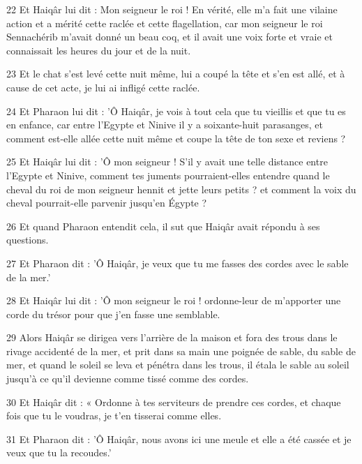 \par 22 Et Haiqâr lui dit : Mon seigneur le roi ! En vérité, elle m'a fait une vilaine action et a mérité cette raclée et cette flagellation, car mon seigneur le roi Sennachérib m'avait donné un beau coq, et il avait une voix forte et vraie et connaissait les heures du jour et de la nuit.

\par 23 Et le chat s'est levé cette nuit même, lui a coupé la tête et s'en est allé, et à cause de cet acte, je lui ai infligé cette raclée.

\par 24 Et Pharaon lui dit : 'Ô Haiqâr, je vois à tout cela que tu vieillis et que tu es en enfance, car entre l'Egypte et Ninive il y a soixante-huit parasanges, et comment est-elle allée cette nuit même et coupe la tête de ton sexe et reviens ?

\par 25 Et Haiqâr lui dit : 'Ô mon seigneur ! S'il y avait une telle distance entre l'Egypte et Ninive, comment tes juments pourraient-elles entendre quand le cheval du roi de mon seigneur hennit et jette leurs petits ? et comment la voix du cheval pourrait-elle parvenir jusqu'en Égypte ?

\par 26 Et quand Pharaon entendit cela, il sut que Haiqâr avait répondu à ses questions.

\par 27 Et Pharaon dit : 'Ô Haiqâr, je veux que tu me fasses des cordes avec le sable de la mer.'

\par 28 Et Haiqâr lui dit : 'Ô mon seigneur le roi ! ordonne-leur de m'apporter une corde du trésor pour que j'en fasse une semblable.

\par 29 Alors Haiqâr se dirigea vers l'arrière de la maison et fora des trous dans le rivage accidenté de la mer, et prit dans sa main une poignée de sable, du sable de mer, et quand le soleil se leva et pénétra dans les trous, il étala le sable au soleil jusqu'à ce qu'il devienne comme tissé comme des cordes.

\par 30 Et Haiqâr dit : « Ordonne à tes serviteurs de prendre ces cordes, et chaque fois que tu le voudras, je t'en tisserai comme elles.

\par 31 Et Pharaon dit : 'Ô Haiqâr, nous avons ici une meule et elle a été cassée et je veux que tu la recoudes.'

